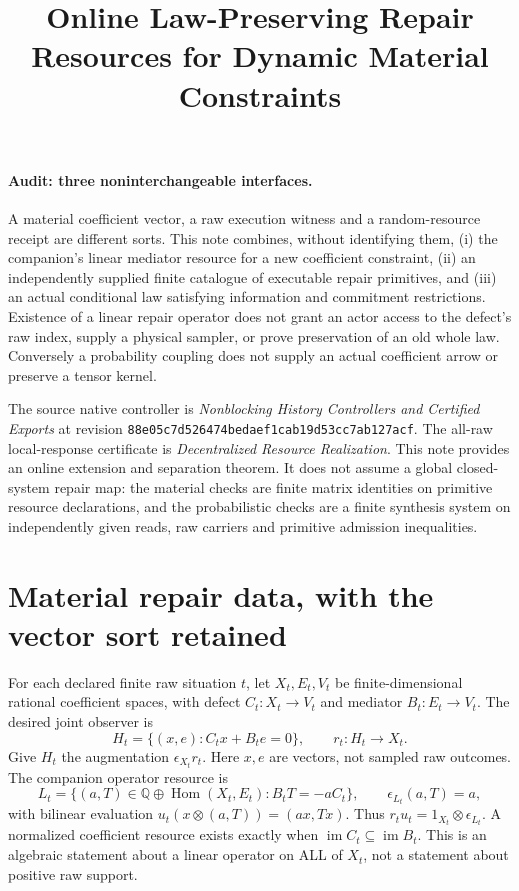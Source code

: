 \documentclass[11pt]{article}
\title{Online Law-Preserving Repair Resources for Dynamic Material Constraints}
\author{}\date{}
\begin{document}
\maketitle
\paragraph{Audit: three noninterchangeable interfaces.}
A material coefficient vector, a raw execution witness and a random-resource receipt are different sorts. This note combines, without identifying them, (i) the companion's linear mediator resource for a new coefficient constraint, (ii) an independently supplied finite catalogue of executable repair primitives, and (iii) an actual conditional law satisfying information and commitment restrictions. Existence of a linear repair operator does not grant an actor access to the defect's raw index, supply a physical sampler, or prove preservation of an old whole law. Conversely a probability coupling does not supply an actual coefficient arrow or preserve a tensor kernel.

The source native controller is \emph{Nonblocking History Controllers and Certified Exports} at revision \texttt{88e05c7d526474bedaef1cab19d53cc7ab127acf}. The all-raw local-response certificate is \emph{Decentralized Resource Realization}. This note provides an online extension and separation theorem. It does not assume a global closed-system repair map: the material checks are finite matrix identities on primitive resource declarations, and the probabilistic checks are a finite synthesis system on independently given reads, raw carriers and primitive admission inequalities.

\section{Material repair data, with the vector sort retained}
For each declared finite raw situation $t$, let $X_t,E_t,V_t$ be finite-dimensional rational coefficient spaces, with defect $C_t:X_t\to V_t$ and mediator $B_t:E_t\to V_t$. The desired joint observer is
\[
 H_t=\{(x,e):C_tx+B_te=0\},\qquad r_t:H_t\to X_t.
\]
Give $H_t$ the augmentation $\epsilon_{X_t}r_t$. Here $x,e$ are vectors, not sampled raw outcomes. The companion operator resource is
\[
 L_t=\{(a,T)\in\mathbb Q\oplus\operatorname{Hom}(X_t,E_t):
                 B_tT=-aC_t\},\qquad\epsilon_{L_t}(a,T)=a,
\]
with bilinear evaluation $u_t(x\otimes(a,T))=(ax,Tx)$. Thus
$r_tu_t=1_{X_t}\otimes\epsilon_{L_t}$. A normalized coefficient resource exists exactly when $\operatorname{im}C_t\subseteq\operatorname{im}B_t$. This is an algebraic statement about a linear operator on ALL of $X_t$, not a statement about positive raw support.
\end{document}

